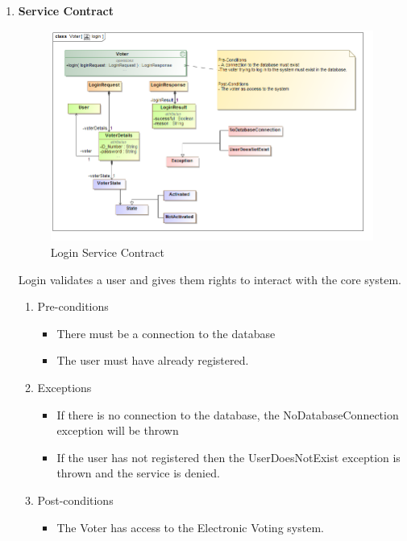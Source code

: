 \begin{enumerate}
		\begin{enumerate}
			\item \textbf{Service Contract}
			\begin{figure}[H]
				\centering
				\includegraphics[width=0.75\linewidth]{../Images/Voter/ServiceContracts/login_serviceContract.png}
				\caption{Login Service Contract}
			\end{figure}
			
			Login validates a user and gives them rights to interact with the core system. 
			\newline
			
			\begin{enumerate}
				\item Pre-conditions
				\begin{itemize}
					\item There must be a connection to the database
					\item The user must have already registered. 
				\end{itemize}
				
				\item Exceptions
				\begin{itemize}
						\item If there is no connection to the database, the NoDatabaseConnection exception will be thrown
						\item If the user has not registered then the UserDoesNotExist exception is thrown and the service is denied. 
				\end{itemize}
				
				\item Post-conditions
				\begin{itemize}
					\item The Voter has access to the Electronic Voting system.
				\end{itemize}
			\end{enumerate}
			

\end{enumerate}
\end{enumerate}
